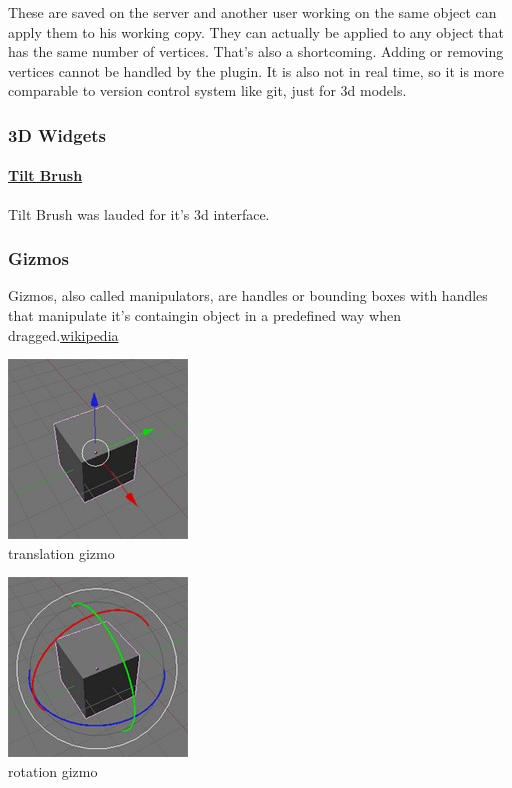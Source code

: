 These are saved on the server and another user working on the same
object can apply them to his working copy. They can actually be applied
to any object that has the same number of vertices. That's also a
shortcoming. Adding or removing vertices cannot be handled by the
plugin. It is also not in real time, so it is more comparable to version
control system like git, just for 3d models.

\subsubsection{3D Widgets}\label{d-widgets}

\paragraph{\texorpdfstring{\href{http://www.tiltbrush.com/}{Tilt
Brush}}{Tilt Brush}}\label{tilt-brush20}

Tilt Brush was lauded for it's 3d interface.

\subsubsection{Gizmos}\label{gizmos}

Gizmos, also called manipulators, are handles or bounding boxes with
handles that manipulate it's containgin object in a predefined way when
dragged.\href{https://en.wikipedia.org/wiki/Gizmo}{wikipedia}

\includegraphics{../assets/Manual-Manipulators-Translate.jpg}\\
 translation gizmo

\includegraphics{../assets/Manual-Manipulators-Rotate.jpg}\\
 rotation gizmo

